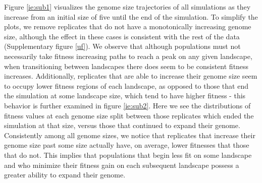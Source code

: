 \documentclass[paper=a4, fontsize=11pt,twoside]{scrartcl}       %
\begin{document}
Figure \ref{ie:sub1} visualizes the genome size trajectories of all simulations as they increase from an initial size of five until the end of the simulation. To simplify the plots, we remove replicates that do not have a monotonically increasing genome size, although the effect in these cases is consistent with the rest of the data (Supplementary figure \ref{uf}). We observe that although populations must not necessarily take fitness increasing paths to reach a peak on any given landscape, when transitioning between landscapes there does seem to be consistent fitness increases. Additionally, replicates that are able to increase their genome size seem to occupy lower fitness regions of each landscape, as opposed to those that end the simulation at some landscape size, which tend to have higher fitness - this behavior is further examined in figure \ref{ie:sub2}. Here we see the distributions of fitness values at each genome size split between those replicates which ended the simulation at that size, versus those that continued to expand their genome. Consistently among all genome sizes, we notice that replicates that increase their genome size past some size actually have, on average, lower fitnesses that those that do not. This implies that populations that begin less fit on some landscape and who minimize their fitness gain on each subsequent landscape possess a greater ability to expand their genome. 
\end{document}
